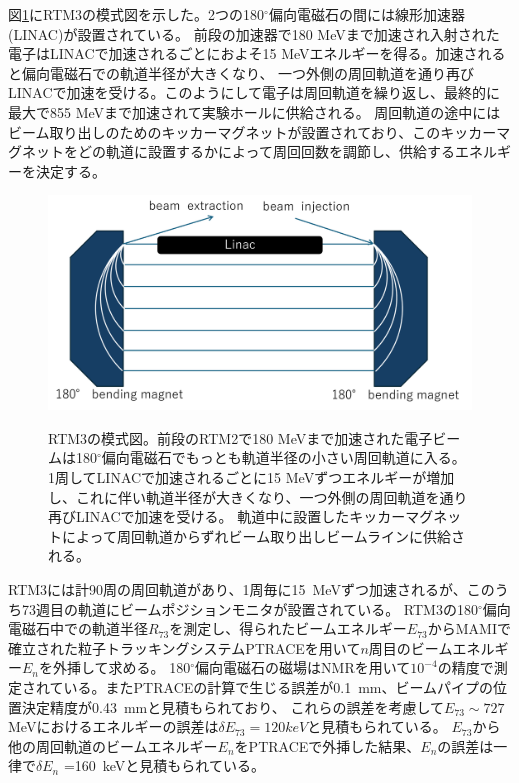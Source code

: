 \documentclass[a4paper,11pt,uplatex]{jsbook}
\begin{document}
図\ref{RTM3}にRTM3の模式図を示した。2つの180$^\circ$偏向電磁石の間には線形加速器(LINAC)が設置されている。
前段の加速器で180 MeVまで加速され入射された電子はLINACで加速されるごとにおよそ15 MeVエネルギーを得る。加速されると偏向電磁石での軌道半径が大きくなり、
一つ外側の周回軌道を通り再びLINACで加速を受ける。このようにして電子は周回軌道を繰り返し、最終的に最大で855 MeVまで加速されて実験ホールに供給される。
周回軌道の途中にはビーム取り出しのためのキッカーマグネットが設置されており、このキッカーマグネットをどの軌道に設置するかによって周回回数を調節し、供給するエネルギーを決定する。
\begin{figure}[h]
  \centering
  \includegraphics[width=0.8\linewidth]{image/3-RTM.png}\\
  \caption[RTM3の模式図]{RTM3の模式図。前段のRTM2で180 MeVまで加速された電子ビームは180$^\circ$偏向電磁石でもっとも軌道半径の小さい周回軌道に入る。
  1周してLINACで加速されるごとに15 MeVずつエネルギーが増加し、これに伴い軌道半径が大きくなり、一つ外側の周回軌道を通り再びLINACで加速を受ける。
  軌道中に設置したキッカーマグネットによって周回軌道からずれビーム取り出しビームラインに供給される。}
  \label{RTM3}
\end{figure}

RTM3には計90周の周回軌道があり、1周毎に15~MeVずつ加速されるが、このうち73週目の軌道にビームポジションモニタが設置されている。
RTM3の180$^\circ$偏向電磁石中での軌道半径$R_{73}$を測定し、得られたビームエネルギー$E_{73}$からMAMIで確立された粒子トラッキングシステムPTRACE\cite{ratschow}を用いて$n$周目のビームエネルギー$E_n$を外挿して求める。
180$^\circ$偏向電磁石の磁場はNMRを用いて$10^{-4}$の精度で測定されている。またPTRACEの計算で生じる誤差が0.1~mm、ビームパイプの位置決定精度が0.43~mmと見積もられており、
これらの誤差を考慮して$E_{73}\sim 727~$MeVにおけるエネルギーの誤差は$\delta E_{73} = 120 keV$と見積もられている\cite{jankowiak}。
$E_{73}$から他の周回軌道のビームエネルギー$E_n$をPTRACEで外挿した結果、$E_n$の誤差は一律で$\delta E_n$ =160~keVと見積もられている\cite{herter}。
\end{document}

